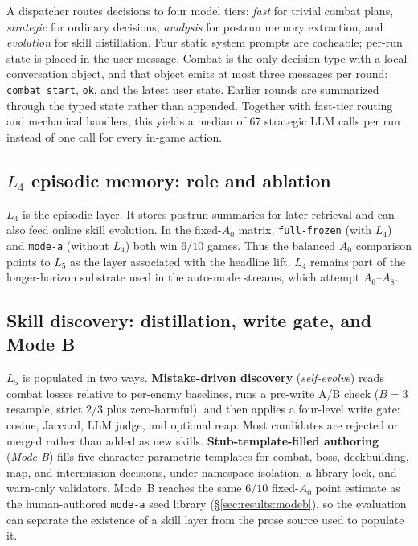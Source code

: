 A dispatcher routes decisions to four model tiers: \emph{fast} for
trivial combat plans, \emph{strategic} for ordinary decisions,
\emph{analysis} for postrun memory extraction, and \emph{evolution}
for skill distillation. Four static system prompts are cacheable;
per-run state is placed in the user message. Combat is the only
decision type with a local conversation object, and that object emits
at most three messages per round: \verb|combat_start|, \verb|ok|,
and the latest user state. Earlier rounds are summarized through the
typed state rather than appended. Together with fast-tier routing
and mechanical handlers, this yields a median of 67 strategic LLM
calls per run instead of one call for every in-game action.

\subsection{\texorpdfstring{$L_4$}{L4} episodic memory: role and ablation}
\label{sec:arch:l4}

$L_4$ is the episodic layer. It stores postrun summaries for later
retrieval and can also feed online skill evolution. In the fixed-$A_0$
matrix, \texttt{full-frozen} (with $L_4$) and \texttt{mode-a}
(without $L_4$) both win $6/10$ games. Thus the balanced $A_0$
comparison points to $L_5$ as the layer associated with the headline
lift. $L_4$ remains part of the longer-horizon substrate used in the
auto-mode streams, which attempt $A_6$--$A_8$.

\subsection{Skill discovery: distillation, write gate, and Mode B}
\label{sec:arch:l5}

$L_5$ is populated in two ways. \textbf{Mistake-driven discovery}
(\emph{self-evolve}) reads combat losses relative to per-enemy
baselines, runs a pre-write A/B check ($B{=}3$ resample, strict
$2/3$ plus zero-harmful), and then applies a four-level write gate:
cosine, Jaccard, LLM judge, and optional reap. Most candidates are
rejected or merged rather than added as new skills. \textbf{Stub-template-filled
authoring} (\emph{Mode B}) fills five character-parametric templates
for combat, boss, deckbuilding, map, and intermission decisions,
under namespace isolation, a library lock, and warn-only validators.
Mode~B reaches the same $6/10$ fixed-$A_0$ point estimate as the
human-authored \texttt{mode-a} seed library (\S\ref{sec:results:modeb}),
so the evaluation can separate the existence of a skill layer from
the prose source used to populate it.

